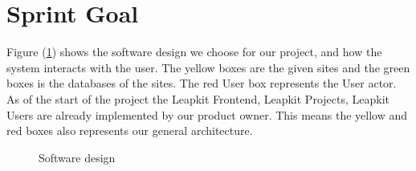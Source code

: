 \section{Sprint Goal}

Figure (\ref{fig:design}) shows the software design we choose for our
project, and how the system interacts with the user. The yellow boxes
are the given sites and the green boxes is the databases of the sites.
The red User box represents the User actor. As of the start of the project
the Leapkit Frontend, Leapkit Projects, Leapkit Users are already implemented by 
our product owner.
This means the yellow and red boxes also represents our general architecture.

\begin{figure}[h]
    \centering
    
    \caption{Software design}
    \label{fig:design}
\end{figure}
